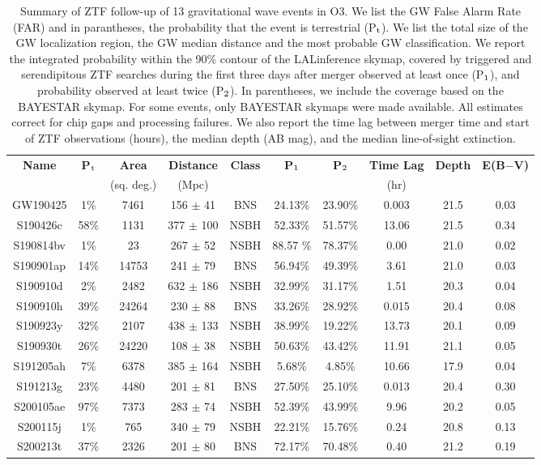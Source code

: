 \begin{table*}
	\centering
	\begin{tabular}{||c c c c c c c c c c||} 
		\hline
		\textbf{Name} & \textbf{P$_{\textup{t}}$} & \textbf{Area} & \textbf{Distance} & \textbf{Class} & \textbf{P$_{\textup{1}}$} & \textbf{P$_{\textup{2}}$} & \textbf{Time Lag} & \textbf{Depth} & \textbf{E(B$-$V)}\\
		&&(sq. deg.)&(Mpc)&&&&(hr)&&\\
		\hline
		GW190425 &  1\% & 7461  & 156 $\pm$ 41& BNS & 24.13\%  & 23.90\%  & 0.003& 21.5 & 0.03\\
		S190426c & 58\% & 1131  & 377 $\pm$ 100 & NSBH & 52.33\%  & 51.57\% & 13.06& 21.5 & 0.34\\
		S190814bv & 1\% & 23  & 267 $\pm$ 52 & NSBH & 88.57 \%  &  78.37\%  & 0.00 & 21.0 & 0.02\\ %
		S190901ap & 14\% & 14753  & 241 $\pm$ 79  & BNS & 56.94\% & 49.39\%  & 3.61& 21.0 & 0.03\\
		S190910d & 2\% & 2482 & 632 $\pm$ 186  & NSBH & 32.99\% & 31.17\%& 1.51& 20.3 & 0.04\\
		S190910h & 39\% & 24264 & 230 $\pm$ 88 & BNS & 33.26\%  & 28.92\% & 0.015& 20.4 & 0.08\\
		S190923y & 32\% & 2107  & 438 $\pm$ 133& NSBH & 38.99\%  & 19.22\% & 13.73& 20.1 & 0.09\\
		S190930t & 26\% & 24220  & 108 $\pm$ 38 & NSBH & 50.63\% & 43.42\% & 11.91& 21.1 & 0.05\\
		S191205ah & 7\% & 6378  & 385 $\pm$ 164  & NSBH & 5.68\% & 4.85\% & 10.66& 17.9 & 0.04\\
		S191213g & 23\% & 4480 & 201 $\pm$ 81  & BNS & 27.50\%  & 25.10\% & 0.013& 20.4 & 0.30\\
		S200105ae & 97\%& 7373  & 283 $\pm$ 74  & NSBH & 52.39\% & 43.99\%  & 9.96 & 20.2 & 0.05\\
		S200115j & 1\% & 765 & 340 $\pm$ 79 & NSBH & 22.21\% & 15.76\%  & 0.24 & 20.8 & 0.13\\
		S200213t & 37\% & 2326  & 201 $\pm$ 80& BNS & 72.17\% & 70.48\%  & 0.40 & 21.2 & 0.19\\
		\hline
	\end{tabular}
	\caption{Summary of ZTF follow-up of 13 gravitational wave events in O3. We list the GW False Alarm Rate (FAR) and in parantheses, the probability that the event is terrestrial (P$_{\textup{t}}$). We list the total size of the GW localization region, the GW median distance and the most probable GW classification. We report the integrated probability within the 90\% contour of the LALinference skymap, covered by triggered and serendipitous ZTF searches during the first three days after merger observed at least once (P$_{\textup{1}}$), and probability observed at least twice (P$_{\textup{2}}$). In parentheses, we include the coverage based on the BAYESTAR skymap. For some events, only BAYESTAR skymaps were made available. All estimates correct for chip gaps and processing failures. We also report the time lag between merger time and start of ZTF observations (hours), the median depth (AB mag), and the median line-of-sight extinction.}
	\label{tab:gw_alerts}
\end{table*}
